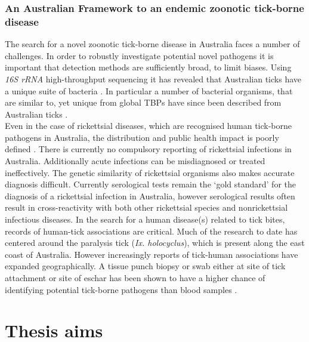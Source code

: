 \documentclass[a4paper, nobind]{templates/ociamthesis}
\begin{document}
\hypertarget{an-australian-framework-to-an-endemic-zoonotic-tick-borne-disease}{%
\subsection{An Australian Framework to an endemic zoonotic tick-borne disease}\label{an-australian-framework-to-an-endemic-zoonotic-tick-borne-disease}}

The search for a novel zoonotic tick-borne disease in Australia faces a number of challenges.
In order to robustly investigate potential novel pathogens it is important that detection methods are sufficiently broad, to limit biases.
Using \emph{16S rRNA} high-throughput sequencing it has revealed that Australian ticks have a unique suite of bacteria \autocite{goftonBacterialProfilingReveals2015,goftonInhibitionEndosymbiontCandidatus2015}.
In particular a number of bacterial organisms, that are similar to, yet unique from global TBPs have since been described from Australian ticks \autocite{goftonPhylogeneticCharacterisationTwo2016,lohNovelBorreliaSpecies2016,goftonDetectionPhylogeneticCharacterisation2017,goftonNovelEhrlichiaSpecies2018}.\\
Even in the case of rickettsial diseases, which are recognised human tick-borne pathogens in Australia, the distribution and public health impact is poorly defined \autocite{stewartRickettsiaAustralisQueensland2017}.
There is currently no compulsory reporting of rickettsial infections in Australia.
Additionally acute infections can be misdiagnosed or treated ineffectively.
The genetic similarity of rickettsial organisms also makes accurate diagnosis difficult.
Currently serological tests remain the `gold standard' for the diagnosis of a rickettsial infection in Australia, however serological results often result in cross-reactivity with both other rickettsial species and nonrickettsial infectious diseases.
In the search for a human disease(s) related to tick bites, records of human-tick associations are critical.
Much of the research to date has centered around the paralysis tick (\emph{Ix. holocyclus}), which is present along the east coast of Australia.
However increasingly reports of tick-human associations have expanded geographically.
A tissue punch biopsy or swab either at site of tick attachment or site of eschar has been shown to have a higher chance of identifying potential tick-borne pathogens than blood samples \autocite{portilloGuidelinesDetectionRickettsia2017}.

\hypertarget{thesis-aims}{%
\chapter*{Thesis aims}\label{thesis-aims}}
\end{document}
